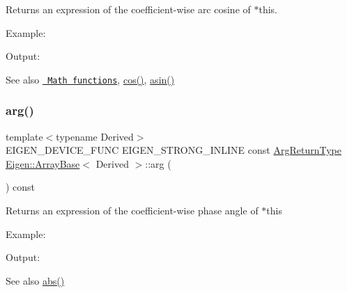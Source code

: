 \begin{DoxyReturn}{Returns}
an expression of the coefficient-\/wise arc cosine of $\ast$this.
\end{DoxyReturn}
Example\+: 
\begin{DoxyCodeInclude}{0}
\end{DoxyCodeInclude}
 Output\+: 
\begin{DoxyVerbInclude}
\end{DoxyVerbInclude}


\begin{DoxySeeAlso}{See also}
\href{group__CoeffwiseMathFunctions.html\#cwisetable_acos}{\texttt{ Math functions}}, \mbox{\hyperlink{class_eigen_1_1_array_base_abe1bff4421b16e62e75f932b83c4d31f}{cos()}}, \mbox{\hyperlink{class_eigen_1_1_array_base_a6d090b549b70fcb9468d16341c2204f2}{asin()}} 
\end{DoxySeeAlso}
\mbox{\label{class_eigen_1_1_array_base_a38ad76c91fa4dcb1daae506098b30ae5}} 
\subsubsection{\texorpdfstring{arg()}{arg()}}
{\footnotesize\ttfamily template$<$typename Derived$>$ \\
E\+I\+G\+E\+N\+\_\+\+D\+E\+V\+I\+C\+E\+\_\+\+F\+U\+NC E\+I\+G\+E\+N\+\_\+\+S\+T\+R\+O\+N\+G\+\_\+\+I\+N\+L\+I\+NE const \mbox{\hyperlink{class_eigen_1_1_cwise_unary_op}{Arg\+Return\+Type}} \mbox{\hyperlink{class_eigen_1_1_array_base}{Eigen\+::\+Array\+Base}}$<$ Derived $>$\+::arg (\begin{DoxyParamCaption}{ }\end{DoxyParamCaption}) const\hspace{0.3cm}{\ttfamily [inline]}}

\begin{DoxyReturn}{Returns}
an expression of the coefficient-\/wise phase angle of {\ttfamily $\ast$this} 
\end{DoxyReturn}
Example\+: 
\begin{DoxyCodeInclude}{0}
\end{DoxyCodeInclude}
 Output\+: 
\begin{DoxyVerbInclude}
\end{DoxyVerbInclude}


\begin{DoxySeeAlso}{See also}
\mbox{\hyperlink{class_eigen_1_1_array_base_a5efe92eb15ea504206269a2a19b9878c}{abs()}} 
\end{DoxySeeAlso}
\mbox{\label{class_eigen_1_1_array_base_a6d090b549b70fcb9468d16341c2204f2}} 
